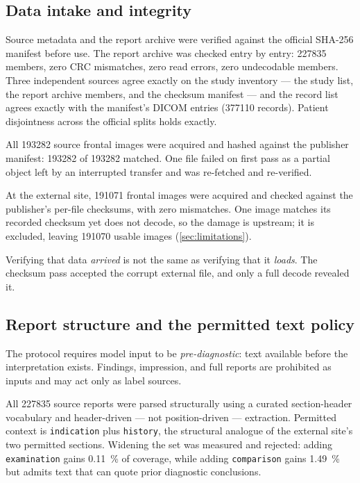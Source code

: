 \subsection{Data intake and integrity}

Source metadata and the report archive were verified against the official
SHA-256 manifest before use. The report archive was checked entry by entry:
\num{227835} members, zero CRC mismatches, zero read errors, zero undecodable
members. Three independent sources agree exactly on the study inventory --- the
study list, the report archive members, and the checksum manifest --- and the
record list agrees exactly with the manifest's DICOM entries (\num{377110}
records). Patient disjointness across the official splits holds exactly.

All \num{193282} source frontal images were acquired and hashed against the
publisher manifest: \num{193282} of \num{193282} matched. One file failed on
first pass as a partial object left by an interrupted transfer and was
re-fetched and re-verified.

At the external site, \num{191071} frontal images were acquired and checked
against the publisher's per-file checksums, with zero mismatches. One image
matches its recorded checksum yet does not decode, so the damage is upstream;
it is excluded, leaving \num{191070} usable images
(\cref{sec:limitations}).

Verifying that data \emph{arrived} is not the same as verifying that it
\emph{loads}. The checksum pass accepted the corrupt external file, and only a
full decode revealed it.

\subsection{Report structure and the permitted text policy}
\label{sec:report-structure}

The protocol requires model input to be \emph{pre-diagnostic}: text available
before the interpretation exists. Findings, impression, and full reports are
prohibited as inputs and may act only as label sources.

All \num{227835} source reports were parsed structurally using a curated
section-header vocabulary and header-driven --- not position-driven ---
extraction. Permitted context is \texttt{indication} plus \texttt{history}, the
structural analogue of the external site's two permitted sections. Widening the
set was measured and rejected: adding \texttt{examination} gains
\SI{0.11}{\percent} of coverage, while adding \texttt{comparison} gains
\SI{1.49}{\percent} but admits text that can quote prior diagnostic conclusions.


